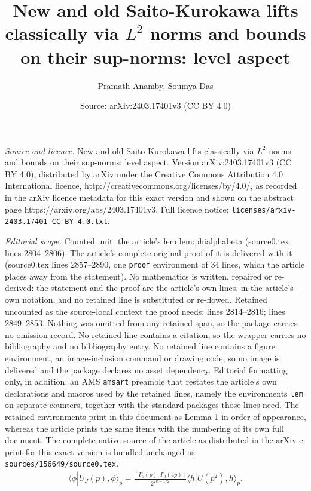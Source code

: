 \documentclass[10pt,a4paper]{amsart}
\title{New and old Saito-Kurokawa lifts classically via $L^2$ norms and bounds on their sup-norms: level aspect}
\author{Pramath Anamby, Soumya Das}
\date{Source: arXiv:2403.17401v3 (CC BY 4.0)}
\newcommand{\lan}{\langle }
\newcommand{\ran}{\rangle}
\begin{document}
\maketitle

\noindent\emph{Source and licence.} New and old Saito-Kurokawa lifts classically via $L^2$ norms and bounds on their sup-norms: level aspect. Version arXiv:2403.17401v3 (CC BY 4.0), distributed by arXiv under the Creative Commons Attribution 4.0 International licence, http://creativecommons.org/licenses/by/4.0/, as recorded in the arXiv licence metadata for this exact version and shown on the abstract page https://arxiv.org/abs/2403.17401v3. Full licence notice: \texttt{licenses/arxiv-2403.17401-CC-BY-4.0.txt}.\par\smallskip

\noindent\textit{Editorial scope.} Counted unit: the article's lem lem:phialphabeta (source0.tex lines 2804--2806). The article's complete original proof of it is delivered with it (source0.tex lines 2857--2890, one \texttt{proof} environment of 34 lines, which the article places away from the statement). No mathematics is written, repaired or re-derived: the statement and the proof are the article's own lines, in the article's own notation, and no retained line is substituted or re-flowed.  Retained uncounted as the source-local context the proof needs: lines 2814--2816; lines 2849--2853.  Nothing was omitted from any retained span, so the package carries no omission record.  No retained line contains a citation, so the wrapper carries no bibliography and no bibliography entry.  No retained line contains a figure environment, an image-inclusion command or drawing code, so no image is delivered and the package declares no asset dependency.  Editorial formatting only, in addition: an AMS \texttt{amsart} preamble that restates the article's own declarations and macros used by the retained lines, namely the environments \texttt{lem} on separate counters, together with the standard packages those lines need.  The retained environments print in this document as Lemma 1 in order of appearance, whereas the article prints the same items with the numbering of its own full document.  The complete native source of the article as distributed in the arXiv e-print for this exact version is bundled unchanged as \texttt{sources/156649/source0.tex}.
\begin{align} \label{ujp-up2}
\lan\phi|U_J(p), \phi\ran_p = \frac{[\Gamma_0(p):\Gamma_0(4p)]}{2^{2k-1/2}}\lan h|U(p^2), h\ran_p.    
\end{align}
\end{document}
